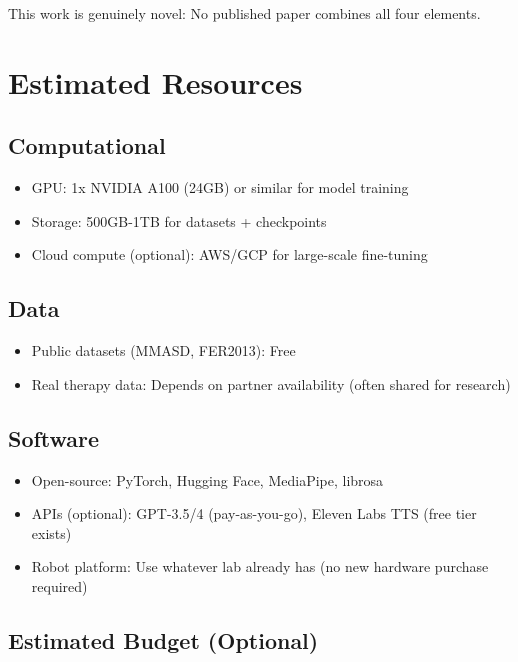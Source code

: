 \documentclass[12pt, a4paper]{article}
\begin{document}
This work is genuinely novel: No published paper combines all four elements.

\section{Estimated Resources}

\subsection{Computational}

\begin{itemize}
    \item GPU: 1x NVIDIA A100 (24GB) or similar for model training
    \item Storage: 500GB-1TB for datasets + checkpoints
    \item Cloud compute (optional): AWS/GCP for large-scale fine-tuning
\end{itemize}

\subsection{Data}

\begin{itemize}
    \item Public datasets (MMASD, FER2013): Free
    \item Real therapy data: Depends on partner availability (often shared for research)
\end{itemize}

\subsection{Software}

\begin{itemize}
    \item Open-source: PyTorch, Hugging Face, MediaPipe, librosa
    \item APIs (optional): GPT-3.5/4 (pay-as-you-go), Eleven Labs TTS (free tier exists)
    \item Robot platform: Use whatever lab already has (no new hardware purchase required)
\end{itemize}

\subsection{Estimated Budget (Optional)}
\end{document}
